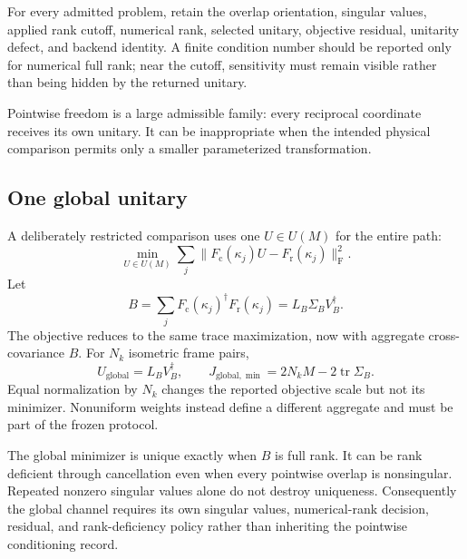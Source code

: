 For every admitted problem, retain the overlap orientation, singular values,
applied rank cutoff, numerical rank, selected unitary, objective residual,
unitarity defect, and backend identity. A finite condition number should be
reported only for numerical full rank; near the cutoff, sensitivity must remain
visible rather than being hidden by the returned unitary.

Pointwise freedom is a large admissible family: every reciprocal coordinate
receives its own unitary. It can be inappropriate when the intended physical
comparison permits only a smaller parameterized transformation.

\subsection{One global unitary}

A deliberately restricted comparison uses one $U\in U(M)$ for the entire path:
\begin{equation}
  \min_{U\in U(M)}
  \sum_j\lVert F_{\mathrm c}(\kappa_j)U
                   -F_{\mathrm r}(\kappa_j)\rVert_{\mathrm F}^2.
  \label{eq:training-composite-global-procrustes}
\end{equation}
Let
\begin{equation}
  B=\sum_jF_{\mathrm c}(\kappa_j)^{\dagger}
          F_{\mathrm r}(\kappa_j)
   =L_B\Sigma_BV_B^{\dagger}.
  \label{eq:training-composite-global-aggregate}
\end{equation}
The objective reduces to the same trace maximization, now with aggregate
cross-covariance $B$. For $N_k$ isometric frame pairs,
\begin{equation}
  U_{\mathrm{global}}=L_BV_B^{\dagger},
  \qquad
  J_{\mathrm{global},\min}=2N_kM-2\operatorname{tr}\Sigma_B.
  \label{eq:training-composite-global-solution}
\end{equation}
Equal normalization by $N_k$ changes the reported objective scale but not its
minimizer. Nonuniform weights instead define a different aggregate and must be
part of the frozen protocol.

The global minimizer is unique exactly when $B$ is full rank. It can be rank
deficient through cancellation even when every pointwise overlap is nonsingular.
Repeated nonzero singular values alone do not destroy uniqueness. Consequently
the global channel requires its own singular values, numerical-rank decision,
residual, and rank-deficiency policy rather than inheriting the pointwise
conditioning record.

